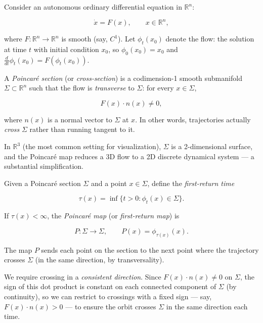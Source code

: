 Consider an autonomous ordinary differential equation in $\mathbb{R}^n$:

\[
\dot{x} = F(x), \qquad x \in \mathbb{R}^n,
\]

where $F: \mathbb{R}^n \to \mathbb{R}^n$ is smooth (say, $C^1$). Let $\phi_t(x_0)$ denote the flow: the solution at time $t$ with initial condition $x_0$, so $\phi_0(x_0) = x_0$ and $\frac{d}{dt}\phi_t(x_0) = F(\phi_t(x_0))$.

\begin{definition}\label{def:4.1}
A \textit{Poincaré section} (or \textit{cross-section}) is a codimension-1 smooth submanifold $\Sigma \subset \mathbb{R}^n$ such that the flow is \textit{transverse} to $\Sigma$: for every $x \in \Sigma$,

\[
F(x) \cdot n(x) \neq 0,
\]

where $n(x)$ is a normal vector to $\Sigma$ at $x$. In other words, trajectories actually \textit{cross} $\Sigma$ rather than running tangent to it.

In $\mathbb{R}^3$ (the most common setting for visualization), $\Sigma$ is a 2-dimensional surface, and the Poincaré map reduces a 3D flow to a 2D discrete dynamical system --- a substantial simplification.
\end{definition}


\begin{definition}\label{def:4.2}
Given a Poincaré section $\Sigma$ and a point $x \in \Sigma$, define the \textit{first-return time}

\[
\tau(x) = \inf\{t > 0 : \phi_t(x) \in \Sigma\}.
\]

If $\tau(x) < \infty$, the \textit{Poincaré map} (or \textit{first-return map}) is

\[
P: \Sigma \to \Sigma, \qquad P(x) = \phi_{\tau(x)}(x).
\]

The map $P$ sends each point on the section to the next point where the trajectory crosses $\Sigma$ (in the same direction, by transversality).
\end{definition}


\begin{remark}
We require crossing in a \textit{consistent direction}. Since $F(x) \cdot n(x) \neq 0$ on $\Sigma$, the sign of this dot product is constant on each connected component of $\Sigma$ (by continuity), so we can restrict to crossings with a fixed sign --- say, $F(x) \cdot n(x) > 0$ --- to ensure the orbit crosses $\Sigma$ in the same direction each time.
\end{remark}



